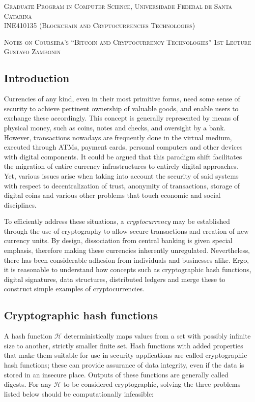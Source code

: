 \documentclass[12pt]{article}
\newcommand{\hh}{\mathcal{H}}
\begin{document}
\textsc{Graduate Program in Computer Science,
  Universidade Federal de Santa Catarina} \\
\textsc{INE410135 (Blockchain and Cryptocurrencies Technologies)}

\textsc{Notes on Coursera's ``Bitcoin and Cryptocurrency Technologies''
  1st Lecture} \\
\textsc{Gustavo Zambonin}

\subsection*{Introduction}

Currencies of any kind, even in their most primitive forms, need some sense of
security to achieve pertinent ownership of valuable goods, and enable users to
exchange these accordingly. This concept is generally represented by means of
physical money, such as coins, notes and checks, and oversight by a bank.
However, transactions nowadays are frequently done in the virtual medium,
executed through ATMs, payment cards, personal computers and other devices with
digital components. It could be argued that this paradigm shift facilitates the
migration of entire currency infrastructures to entirely digital approaches.
Yet, various issues arise when taking into account the security of said systems
with respect to decentralization of trust, anonymity of transactions, storage
of digital coins and various other problems that touch economic and social
disciplines.

To efficiently address these situations, a \emph{cryptocurrency} may be
established through the use of cryptography to allow secure transactions and
creation of new currency units. By design, dissociation from central banking is
given special emphasis, therefore making these currencies inherently
unregulated.  Nevertheless, there has been considerable adhesion from
individuals and businesses alike. Ergo, it is reasonable to understand how
concepts such as cryptographic hash functions, digital signatures, data
structures, distributed ledgers and merge these to construct simple examples of
cryptocurrencies.

\subsection*{Cryptographic hash functions}

A hash function $\hh{}$ deterministically maps values from a set with possibly
infinite size to another, strictly smaller finite set. Hash functions with added
properties that make them suitable for use in security applications are called
cryptographic hash functions; these can provide assurance of data integrity,
even if the data is stored in an insecure place. Outputs of these functions are
generally called digests. For any $\hh{}$ to be considered cryptographic,
solving the three problems listed below should be computationally infeasible:
\end{document}
